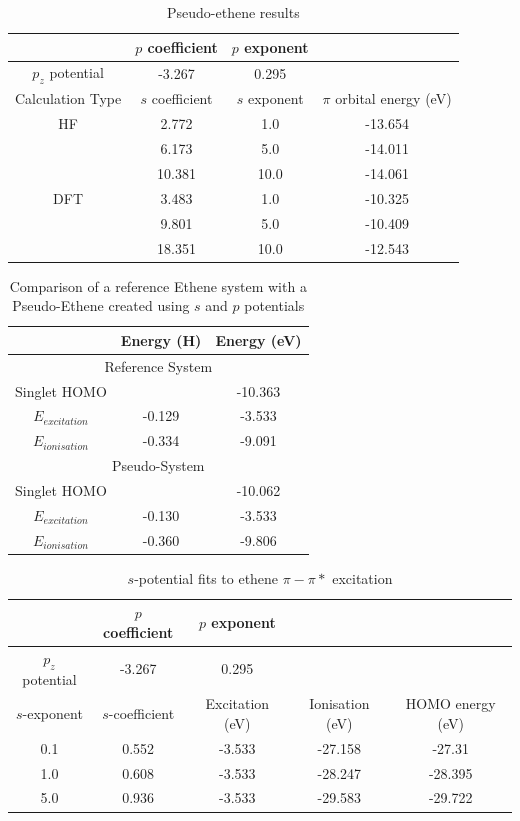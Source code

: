 \documentclass[journal=jctcce,manuscript=article]{achemso}
\begin{document}
\begin{table}[ht]
\caption{Pseudo-ethene results}
\begin{tabular}{c c c c}
\hline\hline
& \(p\) coefficient & \(p\) exponent \\
\hline
\(p_{z}\) potential & -3.267 & 0.295 \\
\hline
Calculation Type & \(s\) coefficient & \(s\) exponent & \(\pi\) orbital energy (eV) \\
\hline
HF & 2.772 & 1.0 & -13.654 \\
 & 6.173 & 5.0 & -14.011 \\
 & 10.381 & 10.0 & -14.061 \\
\hline
DFT & 3.483 & 1.0 & -10.325 \\
 & 9.801 & 5.0 & -10.409 \\
 & 18.351 & 10.0 & -12.543 \\
\hline
\end{tabular}
\label{table:ethene_p_potentials}
\end{table}

\begin{table}[ht]
\caption{Comparison of a reference Ethene system with a Pseudo-Ethene created using \(s\) and \(p\) potentials}
\begin{tabular}{c c c}
\hline\hline
& Energy (H) & Energy (eV) \\
\hline
\multicolumn{3}{c}{Reference System} \\
\hline
Singlet HOMO &  &  -10.363 \\
\(E_{excitation}\) & -0.129 & -3.533 \\
\(E_{ionisation}\) & -0.334 & -9.091 \\
\hline
\multicolumn{3}{c}{Pseudo-System} \\
\hline
Singlet HOMO & & -10.062 \\
\(E_{excitation}\) & -0.130 & -3.533 \\
\(E_{ionisation}\) & -0.360 & -9.806 \\
\hline
\end{tabular}
\label{table:ref_ethene_excitation_energies}
\end{table}

\begin{table}[ht]
\caption{\(s\)-potential fits to ethene \(\pi-\pi*\) excitation}
\begin{tabular}{c c c c c}
\hline\hline
& \(p\) coefficient & \(p\) exponent \\
\hline
\(p_{z}\) potential & -3.267 & 0.295 \\
\hline
\(s\)-exponent & \(s\)-coefficient & Excitation (eV) & Ionisation (eV) & HOMO energy (eV) \\
\hline 
0.1 & 0.552 & -3.533 & -27.158 & -27.31 \\
1.0 & 0.608 & -3.533 & -28.247 & -28.395 \\
5.0 & 0.936 & -3.533 & -29.583 & -29.722 \\
\hline
\end{tabular}
\label{table:early_ethene_excitations}
\end{table}
\end{document}
